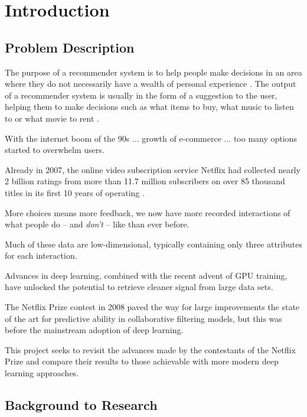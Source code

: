 \chapter{Introduction}

\label{intro} %

\section{Problem Description}
The purpose of a  recommender system is to help people make decisions in an area where they do not necessarily have a wealth of personal experience \parencite{rs_1.1_Resnick}. The output of a recommender system is usually in the form of a suggestion to the user, helping them to make decisions such as what items to buy, what music to listen to or what movie to rent \parencite{handbook_1.1_intro}.

With the internet boom of the 90s ... growth of e-commerce ... too many options started to overwhelm users. 

Already in 2007, the online video subscription service Netflix had collected nearly 2 billion ratings from more than 11.7 million subscribers on over 85 thousand titles in its first 10 years of operating \parencite{netflix_description}.

More choices means more feedback, we now have more recorded interactions of what people do -- and \textit{don't} -- like than ever before.

Much of these data are low-dimensional, typically containing only three attributes for each interaction.

Advances in deep learning, combined with the recent advent of GPU training, have unlocked the potential to retrieve cleaner signal from large data sets.

The Netflix Prize contest in 2008 paved the way for large improvements the state of the art for predictive ability in collaborative filtering models, but this was before the mainstream adoption of deep learning.

This project seeks to revisit the advances made by the contestants of the Netflix Prize and compare their results to those achievable with more modern deep learning approaches.

\section{Background to Research}


